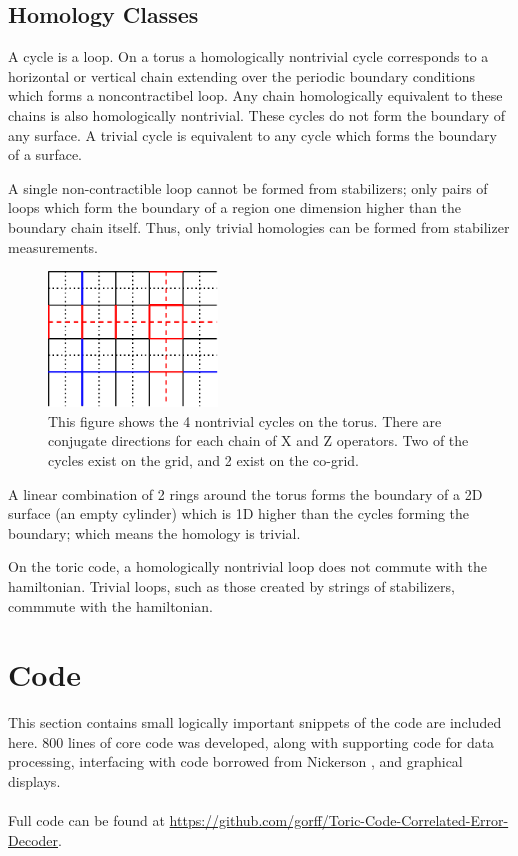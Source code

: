 		\subsection{Homology Classes}
		\label{app:cycles}

		A cycle is a loop. On a torus a homologically nontrivial cycle corresponds to a horizontal or vertical chain extending over the periodic boundary conditions which forms a noncontractibel loop. Any chain homologically equivalent to these chains is also homologically nontrivial. These cycles do not form the boundary of any surface. A trivial cycle is equivalent to any cycle which forms the boundary of a surface. 
		
		A single non-contractible loop cannot be formed from stabilizers; only pairs of loops which form the boundary of a region one dimension higher than the boundary chain itself. Thus, only trivial homologies can be formed from stabilizer measurements. 
		\begin{figure}
		\centering
		\includegraphics[width = 0.4\textwidth]{figs/errors.eps}
		\caption{This figure shows the 4 nontrivial cycles on the torus. There are conjugate directions for each chain of X and Z operators. Two of the cycles exist on the grid, and 2 exist on the co-grid.}
		\label{fig:errors}
		\end{figure}
		A linear combination of 2 rings around the torus forms the boundary of a 2D surface (an empty cylinder) which is 1D higher than the cycles forming the boundary; which means the homology is trivial.
		
		On the toric code, a homologically nontrivial loop does not commute with the hamiltonian. Trivial loops, such as those created by strings of stabilizers, commmute with the hamiltonian. 
		
\section{Code}
	This section contains small logically important snippets of the code are included here. 800 lines of core code was developed, along with supporting code for data processing, interfacing with code borrowed from Nickerson \cite{Nickerson2014}, and graphical displays.	
	\\\\
	Full code can be found at \url{https://github.com/gorff/Toric-Code-Correlated-Error-Decoder}.
		
